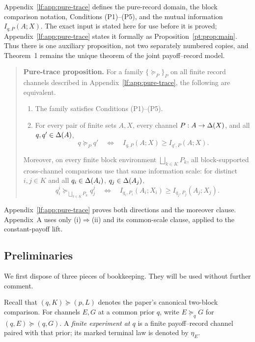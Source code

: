 Appendix~\ref{lf:app:pure-trace} defines the pure-record domain, the block
comparison notation, Conditions \textup{(P1)--(P5)}, and the mutual information
$I_{q,P}(A;X)$.  The exact input is stated here for use before it is proved;
Appendix~\ref{lf:app:pure-trace} states it formally as
Proposition~\ref{pt:prop:main}.  Thus there is one auxiliary proposition, not
two separately numbered copies, and Theorem~1 remains the unique theorem of
the joint payoff--record model.

\begin{quote}
\noindent\textbf{Pure-trace proposition.}
For a family $\{\succeq_P\}_P$ on all finite record channels described in
Appendix~\ref{lf:app:pure-trace}, the following are equivalent.
\begin{enumerate}[label=\textup{(\roman*)},leftmargin=*]
\item The family satisfies Conditions \textup{(P1)--(P5)}.
\item For every pair of finite sets $A,X$, every channel
  $P:A\to\Delta(X)$, and all $q,q'\in\Delta(A)$,
  \[
  q\succeq_Pq'
  \quad\Longleftrightarrow\quad
  I_{q,P}(A;X)\ge I_{q',P}(A;X).
  \]
\end{enumerate}
Moreover, on every finite block environment
$\bigsqcup_{k\in K}P_k$, all block-supported cross-channel comparisons use
that same information scale: for distinct $i,j\in K$ and all
$q_i\in\Delta(A_i)$, $q_j\in\Delta(A_j)$,
\[
q_i^i\succeq_{\bigsqcup_{k\in K}P_k}q_j^j
\quad\Longleftrightarrow\quad
I_{q_i,P_i}(A_i;X_i)\ge I_{q_j,P_j}(A_j;X_j).
\]
\end{quote}

Appendix~\ref{lf:app:pure-trace} proves both directions and the moreover
clause.  Appendix~A uses only \textup{(i)$\Rightarrow$(ii)} and its common-scale
clause, applied to the constant-payoff lift.

\subsection{Preliminaries}

We first dispose of three pieces of bookkeeping.  They will be used without
further comment.

Recall that $(q,K)\succeq(p,L)$ denotes the paper's canonical two-block
comparison.  For channels $E,G$ at a common prior $q$, write
$E\succeq_q G$ for $(q,E)\succeq(q,G)$.  A \emph{finite experiment at $q$}
is a finite payoff--record channel paired with that prior; its marked terminal
law is denoted by $\eta_E$.


